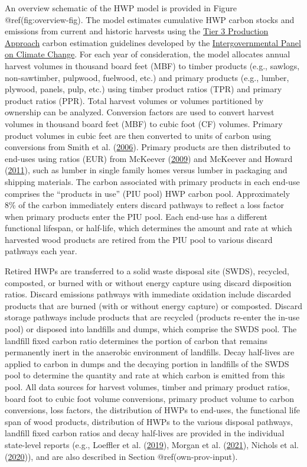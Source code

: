 \documentclass[
  openany]{book}
\begin{document}
An overview schematic of the HWP model is provided in Figure
@ref(fig:overview-fig). The model estimates cumulative HWP carbon stocks
and emissions from current and historic harvests using the
\href{https://www.ipcc-nggip.iges.or.jp/public/2006gl/pdf/4_Volume4/V4_04_Ch4_Forest_Land.pdf}{Tier
3 Production Approach} carbon estimation guidelines developed by the
\href{https://www.ipcc.ch/}{Intergovernmental Panel on Climate Change}.
For each year of consideration, the model allocates annual harvest
volumes in thousand board feet (MBF) to timber products (e.g., sawlogs,
non-sawtimber, pulpwood, fuelwood, etc.) and primary products (e.g.,
lumber, plywood, panels, pulp, etc.) using timber product ratios (TPR)
and primary product ratios (PPR). Total harvest volumes or volumes
partitioned by ownership can be analyzed. Conversion factors are used to
convert harvest volumes in thousand board feet (MBF) to cubic foot (CF)
volumes. Primary product volumes in cubic feet are then converted to
units of carbon using conversions from Smith et al.
(\protect\hyperlink{ref-smith2006}{2006}). Primary products are then
distributed to end-uses using ratios (EUR) from McKeever
(\protect\hyperlink{ref-mckeever2009}{2009}) and McKeever and Howard
(\protect\hyperlink{ref-mckeever2011}{2011}), such as lumber in single
family homes versus lumber in packaging and shipping materials. The
carbon associated with primary products in each end-use comprises the
``products in use'' (PIU pool) HWP carbon pool. Approximately 8\% of the
carbon immediately enters discard pathways to reflect a loss factor when
primary products enter the PIU pool. Each end-use has a different
functional lifespan, or half-life, which determines the amount and rate
at which harvested wood products are retired from the PIU pool to
various discard pathways each year.

Retired HWPs are transferred to a solid waste disposal site (SWDS),
recycled, composted, or burned with or without energy capture using
discard disposition ratios. Discard emissions pathways with immediate
oxidation include discarded products that are burned (with or without
energy capture) or composted. Discard storage pathways include products
that are recycled (products re-enter the in-use pool) or disposed into
landfills and dumps, which comprise the SWDS pool. The landfill fixed
carbon ratio determines the portion of carbon that remains permanently
inert in the anaerobic environment of landfills. Decay half-lives are
applied to carbon in dumps and the decaying portion in landfills of the
SWDS pool to determine the quantity and rate at which carbon is emitted
from this pool. All data sources for harvest volumes, timber and primary
product ratios, board foot to cubic foot volume conversions, primary
product volume to carbon conversions, loss factors, the distribution of
HWPs to end-uses, the functional life span of wood products,
distribution of HWPs to the various disposal pathways, landfill fixed
carbon ratios and decay half-lives are provided in the individual
state-level reports (e.g., Loeffler et al.
(\protect\hyperlink{ref-loeffler2019}{2019}), Morgan et al.
(\protect\hyperlink{ref-morgan2021}{2021}), Nichols et al.
(\protect\hyperlink{ref-nichols2020}{2020})), and are also described in
Section @ref(own-prov-input).
\end{document}
